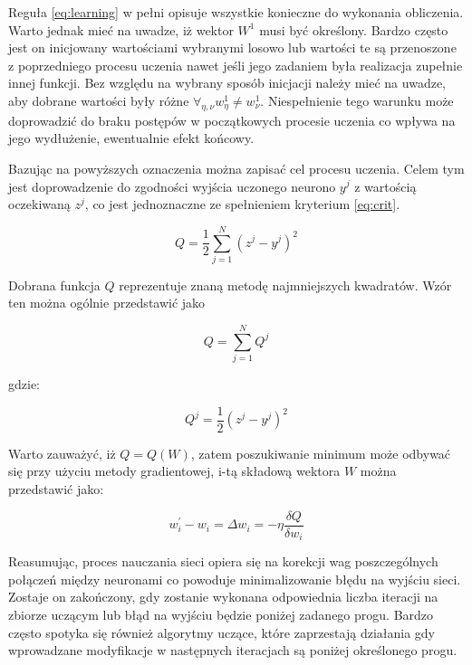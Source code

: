 Reguła \ref{eq:learning} w pełni opisuje wszystkie konieczne do wykonania obliczenia. Warto jednak mieć na uwadze, iż wektor $W^{1}$ musi być określony. Bardzo często jest on inicjowany wartościami wybranymi losowo lub wartości te są przenoszone z poprzedniego procesu uczenia nawet jeśli jego zadaniem była realizacja zupełnie innej funkcji.
Bez względu na wybrany sposób inicjacji należy mieć na uwadze, aby dobrane wartości były różne $\forall_{\eta, \nu} w^{1}_{\eta} \neq w^{1}_{\nu} $. Niespełnienie tego warunku może doprowadzić do braku postępów w początkowych procesie uczenia co wpływa na jego wydłużenie, ewentualnie efekt końcowy. 

Bazując na powyższych oznaczenia można zapisać cel procesu uczenia. Celem tym jest doprowadzenie do zgodności wyjścia uczonego neurono $y^{j}$ z wartością oczekiwaną $z^{j}$, co jest jednoznaczne ze spełnieniem kryterium \ref{eq:crit}.

\begin{equation}
Q = \frac{1}{2} \sum_{j = 1}^{N} (z^{j} - y^{j})^{2}
\label{eq:crit}
\end{equation}

Dobrana funkcja $Q$ reprezentuje znaną metodę najmniejszych kwadratów.
Wzór ten można ogólnie przedstawić jako

\begin{equation}
Q = \sum_{j = 1}^{N} Q^{j}
\label{eq:common_crit}
\end{equation}

gdzie:

\begin{equation}
Q^{j} = \frac{1}{2}(z^{j} - y^{j})^{2}
\label{eq:condition_crit}
\end{equation}

Warto zauważyć, iż $Q = Q(W)$, zatem poszukiwanie minimum może odbywać się przy użyciu metody gradientowej, i-tą składową wektora $W$ można przedstawić jako:

\begin{equation}
w^{'}_i - w_{i} = \Delta w_{i} = - \eta \frac{\delta Q}{\delta w_{i}}
\label{eq:delta_member}
\end{equation}


Reasumując, proces nauczania sieci opiera się na korekcji wag poszczególnych połączeń między neuronami co powoduje minimalizowanie błędu na wyjściu sieci. Zostaje on zakończony, gdy zostanie wykonana odpowiednia liczba iteracji na zbiorze uczącym lub błąd na wyjściu będzie poniżej zadanego progu. Bardzo często spotyka się również algorytmy uczące, które zaprzestają działania gdy wprowadzane modyfikacje w następnych iteracjach są poniżej określonego progu.



